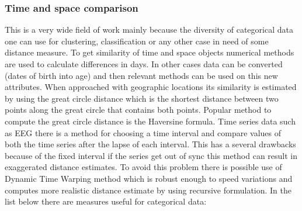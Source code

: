 \subsubsection{Time and space comparison}
This is a very wide field of work mainly because the diversity of categorical data one can use for clustering, classification or any other case in need of some distance measure.
To get similarity of time and space objects numerical methods are used to calculate differences in days. In other cases data can be converted (dates of birth into age) and then relevant methods can be used on this new attributes.
When approached with geographic locations its similarity is estimated by using the great circle distance which is the shortest distance between two points along the great circle that contains both points. Popular method to compute the great circle distance is the Haversine formula.
Time series data such as EEG there is a method for choosing a time interval and compare values of both the time series after the lapse of each interval. This has a several drawbacks because of the fixed interval if the series get out of sync this method can result in exaggerated distance estimates. To avoid this problem there is possible use of Dynamic Time Warping method which is robust enough to speed variations and computes more realistic distance estimate by using recursive formulation.
In the list below there are measures useful for categorical data:
